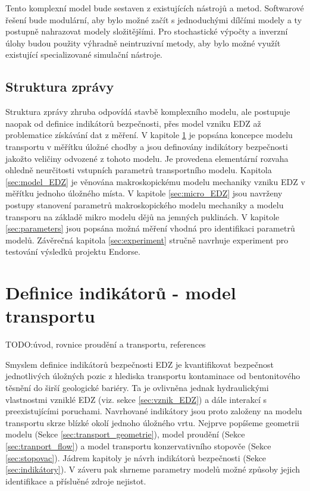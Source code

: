 \documentclass{article}
\def\todo#1{{TODO:\color{violet}#1}}
\newcommand{\alert}[1]{{\color{red}#1}}
\begin{document}
Tento komplexní model bude sestaven z existujících nástrojů a metod. Softwarové řešení bude modulární, aby bylo možné začít s
jednoduchými dílčími modely a ty postupně nahrazovat modely složitějšími. Pro stochastické výpočty a inverzní úlohy budou 
použity výhradně neintruzivní metody, aby bylo možné využít existující specializované simulační nástroje.

    
\subsection{Struktura zprávy}
Struktura zprávy zhruba odpovídá stavbě komplexního modelu, ale postupuje naopak od definice indikátorů bezpečnosti,
přes model vzniku EDZ až problematice získávání dat z měření. 
V kapitole \ref{sec:transport} je popsána koncepce modelu transportu v měřítku úložné chodby a 
jsou definovány indikátory bezpečnosti jakožto veličiny odvozené z tohoto modelu. Je provedena elementární rozvaha ohledně 
neurčitosti vstupních parametrů transportního modelu. Kapitola
\ref{sec:model_EDZ} je věnována makroskopickému modelu mechaniky vzniku EDZ v měřítku jednoho úložného místa. 
V kapitole \ref{sec:micro_EDZ} jsou navrženy postupy stanovení parametrů makroskopického modelu mechaniky a modelu transporu 
na základě mikro modelu dějů na jemných puklinách.
V kapitole \ref{sec:parameters} jsou popsána možná měření vhodná pro identifikaci 
parametrů modelů. Závěrečná kapitola \ref{sec:experiment} stručně navrhuje experiment pro testování výsledků projektu Endorse.


\section{Definice indikátorů - model transportu}
\label{sec:transport}
\todo{úvod, rovnice proudění a transportu, references}

Smyslem definice indikátorů bezpečnosti EDZ je kvantifikovat bezpečnost jednotlivých úložných pozic z hlediska 
transportu kontaminace od bentonitového těsnění do širší geologické bariéry. Ta je ovlivněna jednak hydraulickými vlastnostmi
vzniklé EDZ (viz. sekce \ref{sec:vznik_EDZ}) a dále interakcí s preexistujícími poruchami. 
Navrhované indikátory jsou proto založeny na modelu transportu skrze blízké okolí jednoho úložného vrtu. 
Nejprve popíšeme geometrii modelu (Sekce  \ref{sec:transport_geometrie}), model proudění (Sekce \ref{sec:tranport_flow})
a model transportu konzervativního stopovče (Sekce \ref{sec:stopovac}). Jádrem kapitoly je návrh indikátorů bezpečnosti (Sekce \ref{sec:indikátory}). 
V záveru pak shrneme parametry modelů \alert{možné způsoby jejich identifikace a přísluěné zdroje nejistot.}
\end{document}
